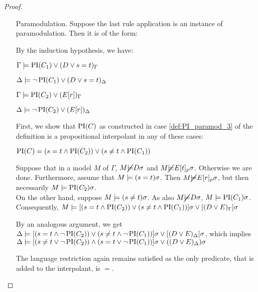 \begin{proof}
\begin{itemize}
		\item[Paramodulation.]	
			Suppose the last rule application is an instance of paramodulation. Then it is of the form:
			\begin{prooftree}
			\end{prooftree}


			By the induction hypothesis, we have:

			$\Gamma \models \operatorname{PI}(C_1) \lor (D\lor s=t)_\Gamma$

			$\Delta \models \lnot \operatorname{PI}(C_1) \lor (D\lor s=t)_\Delta$

			$\Gamma \models \operatorname{PI}(C_2) \lor (E[r])_\Gamma$

			$\Delta \models \lnot \operatorname{PI}(C_2) \lor (E[r])_\Delta$

			First, we show that $\operatorname{PI}(C)$ as constructed in case \ref{def:PI_paramod_3} of the definition is a propositional interpolant in any of these cases:

			$\operatorname{PI}(C) = (s=t \land \operatorname{PI}(C_2)) \lor (s\neq t \land \operatorname{PI}(C_1)) $

			Suppose that in a model $M$ of $\Gamma$, $M \cancel {\models} D\sigma$ and $M \cancel {\models} E{[t]_{p}}\sigma$. Otherwise we are done.
			Furthermore, assume that $M \models (s=t)\sigma$. Then $M \cancel {\models} E{[r]_{p}}\sigma$, but then necessarily $M \models \operatorname{PI}(C_2)\sigma$. \\
			On the other hand, suppose $M \models (s\neq t)\sigma$. As also $M \cancel {\models} D\sigma$, $M \models \operatorname{PI}(C_1)\sigma$.
			Consequently, $M \models [(s=t \land \operatorname{PI}(C_2)) \lor (s\neq t \land \operatorname{PI}(C_1))]\sigma \lor [(D \lor E)_\Gamma]\sigma$

			By an analogous argument, we get $\Delta \models [(s=t \land \lnot \operatorname{PI}(C_2)) \lor (s\neq t \land \lnot \operatorname{PI}(C_1))]\sigma \lor [(D \lor E)_\Delta]\sigma$,
			which implies
			$\Delta \models [( s\neq t \lor \lnot \operatorname{PI}(C_2)) \land (s = t \lor \lnot \operatorname{PI}(C_1))]\sigma \lor ((D \lor E)_\Delta)\sigma $


			The language restriction again remains satisfied as the only predicate, that is added to the interpolant, is $=$.


\end{itemize}
\end{proof}
